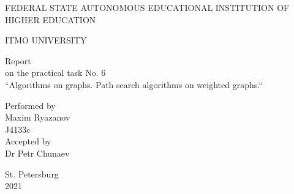 \documentclass[12pt,a4paper]{report}
\begin{document}
	\vspace*{15ex}
	\begin{center}
		FEDERAL STATE AUTONOMOUS EDUCATIONAL INSTITUTION OF HIGHER EDUCATION 
		
		ITMO UNIVERSITY
		\vspace*{30ex}
		
		Report\\
		on the practical task No. 6\\
		``Algorithms on graphs. Path search algorithms on weighted graphs.``
	\end{center}
	\vspace{25ex}
	\begin{flushright}
		Performed by\\
		Maxim Ryazanov\\
		J4133c\\
		Accepted by\\
		Dr Petr Chunaev
	\end{flushright}
	\vspace{20ex}
	\begin{center}
		St. Petersburg\\
		2021
	\end{center}
	\newpage

    
	
	
	
	
\end{document}
